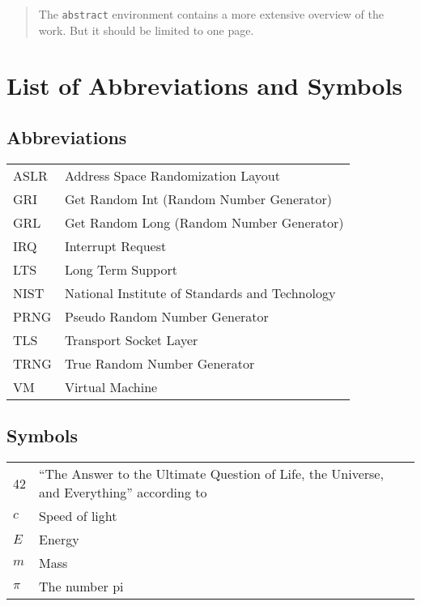 \documentclass[master=emitm,masteroption=bc,oneside]{kulemt}
\begin{document}
\tableofcontents*

\begin{abstract}
  The \texttt{abstract} environment contains a more extensive overview of
  the work. But it should be limited to one page.

  \lipsum[1]
\end{abstract}

\listoffiguresandtables
\chapter{List of Abbreviations and Symbols}
\section*{Abbreviations}
\begin{flushleft}
  \renewcommand{\arraystretch}{1.1}
  \begin{tabularx}{\textwidth}{@{}p{12mm}X@{}}
    ASLR  & Address Space Randomization Layout \\  	
    GRI   & Get Random Int (Random Number Generator)\\
	GRL	  & Get Random Long (Random Number Generator)\\
	IRQ	  & Interrupt Request \\
	LTS	  & Long Term Support\\
    NIST  & National Institute of Standards and Technology \\
    PRNG  & Pseudo Random Number Generator \\    
	TLS   & Transport Socket Layer \\           
    TRNG  & True Random Number Generator \\ 
    VM	  & Virtual Machine \\
  \end{tabularx}
\end{flushleft}
\section*{Symbols}
\begin{flushleft}
  \renewcommand{\arraystretch}{1.1}
  \begin{tabularx}{\textwidth}{@{}p{12mm}X@{}}
    42    & ``The Answer to the Ultimate Question of Life, the Universe,
            and Everything'' according to \cite{h2g2} \\
    $c$   & Speed of light \\
    $E$   & Energy \\
    $m$   & Mass \\
    $\pi$ & The number pi \\
  \end{tabularx}
\end{flushleft}
\end{document}

